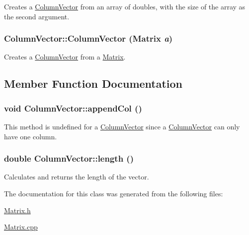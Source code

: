 Creates a \hyperlink{class_column_vector}{ColumnVector} from an array of doubles, with the size of the array as the second argument. 

\hypertarget{class_column_vector_a3fae5c07b5b805aa05da3c9952838892}{
\subsubsection[{ColumnVector}]{\setlength{\rightskip}{0pt plus 5cm}ColumnVector::ColumnVector ({\bf Matrix} {\em a})}}
\label{class_column_vector_a3fae5c07b5b805aa05da3c9952838892}


Creates a \hyperlink{class_column_vector}{ColumnVector} from a \hyperlink{class_matrix}{Matrix}. 



\subsection{Member Function Documentation}
\hypertarget{class_column_vector_a0e67b7831d9d4c02691056a72abc6975}{
\subsubsection[{appendCol}]{\setlength{\rightskip}{0pt plus 5cm}void ColumnVector::appendCol ()}}
\label{class_column_vector_a0e67b7831d9d4c02691056a72abc6975}


This method is undefined for a \hyperlink{class_column_vector}{ColumnVector} since a \hyperlink{class_column_vector}{ColumnVector} can only have one column. 

\hypertarget{class_column_vector_a66329a870ee70b5cd93879d3be247b21}{
\subsubsection[{length}]{\setlength{\rightskip}{0pt plus 5cm}double ColumnVector::length ()}}
\label{class_column_vector_a66329a870ee70b5cd93879d3be247b21}


Calculates and returns the length of the vector. 



The documentation for this class was generated from the following files:\begin{DoxyCompactItemize}
\item 
\hyperlink{_matrix_8h}{Matrix.h}\item 
\hyperlink{_matrix_8cpp}{Matrix.cpp}\end{DoxyCompactItemize}
